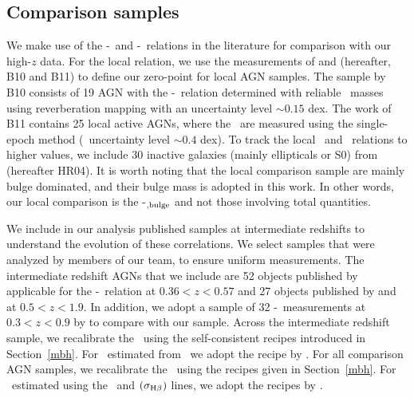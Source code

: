 \documentclass[apj]{emulateapj}
\begin{document}
\subsection{Comparison samples}\label{sec:compare_sample}

We make use of the \mbh-\lhost\ and \mbh-\smass\ relations in the literature for comparison with our high-$z$ data. For the local relation, we use the measurements of \citet{Ben++10} and \citet{Bennert++2011} (hereafter, B10 and B11) to define our zero-point for local AGN samples. The sample by B10 consists of 19 AGN with the \mbh-\lhost\ relation determined with reliable \mbh\ masses using reverberation mapping with an uncertainty level $\sim0.15$ dex. The work of B11 contains 25 local active AGNs, where the \mbh\ are measured using the single-epoch method (\mbh\ uncertainty level $\sim0.4$ dex). To track the local \smass\ and \mbh\  relations to higher values, we include 30 inactive galaxies (mainly ellipticals or S0) from \citet{H+R04} (hereafter HR04). It is worth noting that the local comparison sample are mainly bulge dominated, and their bulge mass is adopted in this work. In other words, our local comparison is the \mbh-\smass$_{\rm ,bulge}$ and not those involving total quantities.

We include in our analysis published samples at intermediate redshifts to understand the evolution of these correlations. We select samples that were analyzed by members of our team, to ensure uniform measurements. The intermediate redshift AGNs that we include are 52 objects published by \citet{Park15} applicable for the \mbh-\lhost\ relation at $0.36<z<0.57$ and 27 objects published by \citet{Bennert11} and \citet{SS13} at $0.5<z<1.9$. In addition, we adopt a sample of 32 \mbh-\smass\ measurements at $0.3<z<0.9$ by \citet{Cisternas2011} to compare with our sample. Across the intermediate redshift sample, we recalibrate the \mbh\ using the self-consistent recipes introduced in Section~\ref{mbh}. For \mbh\ estimated from \Mgii\, we adopt the recipe by \citet{Ding2017b}. For all comparison AGN samples, we recalibrate the \mbh\ using the recipes given in Section~\ref{mbh}. For \mbh\ estimated using the \Mgii\ and  \hbeta$(\sigma_{\rm H\beta})$ lines, we adopt the recipes by \citet{Ding2017b}.
\end{document}
